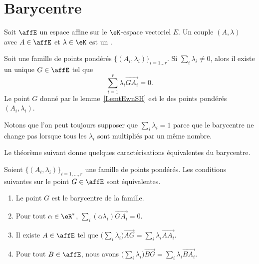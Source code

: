 \section{Barycentre}

Soit \( \affE\) un espace affine sur le \( \eK\)-espace vectoriel \( E\). Un couple \( (A,\lambda)\) avec \( A\in \affE\) et \( \lambda\in \eK\) est un .

\begin{lemmaDef}        \label{LemtEwnSH}
	Soit une famille de points pondérés \( \{ (A_i,\lambda_i) \}_{i=1\ldots r}\). Si \( \sum_i\lambda_i\neq 0\), alors il existe un unique \( G\in \affE\) tel que
	\begin{equation}
		\sum_{i=1}^r\lambda_i\overrightarrow{ GA_i }=0.
	\end{equation}
	Le point \( G\) donné par le lemme~\ref{LemtEwnSH} est le  des points pondérés \( (A_i,\lambda_i)\).
\end{lemmaDef}


Notons que l'on peut toujours supposer que \( \sum_i\lambda_i=1\) parce que le barycentre ne change pas lorsque tous les \( \lambda_i\) sont multipliés par un même nombre.


Le théorème suivant donne quelques caractérisations équivalentes du barycentre.
\begin{theorem}      \label{ThoIJVzxr}
	Soient \( \{ (A_i,\lambda_i) \}_{i=1,\ldots, r}\) une famille de points pondérés. Les conditions suivantes sur le point \( G\in \affE\) sont équivalentes.
	\begin{enumerate}
		\item
		      Le point \( G\) est le barycentre de la famille.
		\item
		      Pour tout \( \alpha\in \eR^*\), \( \sum_i(\alpha\lambda_i)\overrightarrow{ GA_i }=0\).
		\item
		      Il existe \( A\in\affE\) tel que \( \big( \sum_i\lambda_i \big)\overrightarrow{ AG }=\sum_i\lambda_i\overrightarrow{ AA_i }\).
		\item   \label{ItemEgOQBX}
		      Pour tout \( B\in\affE\), nous avons \( \big( \sum_i\lambda_i \big)\overrightarrow{ BG }=\sum_i\lambda_i\overrightarrow{ BA_i }\).
	\end{enumerate}
\end{theorem}

